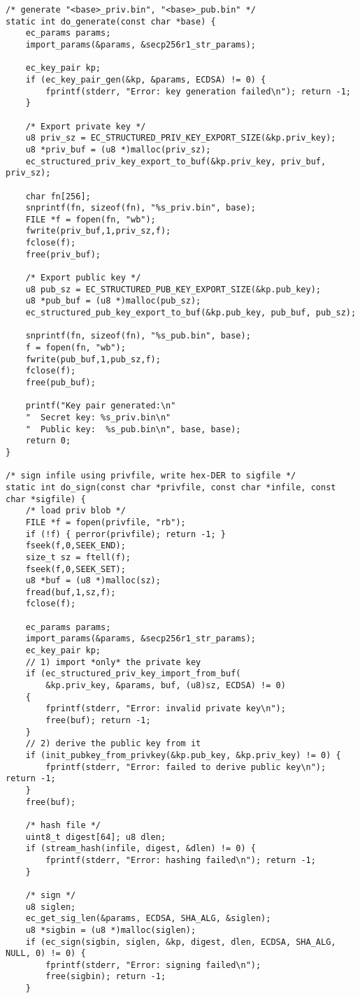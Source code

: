 \begin{lstlisting}[style=cstyle]
/* generate "<base>_priv.bin", "<base>_pub.bin" */
static int do_generate(const char *base) {
	ec_params params;
	import_params(&params, &secp256r1_str_params);
	
	ec_key_pair kp;
	if (ec_key_pair_gen(&kp, &params, ECDSA) != 0) {
		fprintf(stderr, "Error: key generation failed\n"); return -1;
	}
	
	/* Export private key */
	u8 priv_sz = EC_STRUCTURED_PRIV_KEY_EXPORT_SIZE(&kp.priv_key);
	u8 *priv_buf = (u8 *)malloc(priv_sz);
	ec_structured_priv_key_export_to_buf(&kp.priv_key, priv_buf, priv_sz);
	
	char fn[256];
	snprintf(fn, sizeof(fn), "%s_priv.bin", base);
	FILE *f = fopen(fn, "wb");
	fwrite(priv_buf,1,priv_sz,f);
	fclose(f);
	free(priv_buf);
	
	/* Export public key */
	u8 pub_sz = EC_STRUCTURED_PUB_KEY_EXPORT_SIZE(&kp.pub_key);
	u8 *pub_buf = (u8 *)malloc(pub_sz);
	ec_structured_pub_key_export_to_buf(&kp.pub_key, pub_buf, pub_sz);
	
	snprintf(fn, sizeof(fn), "%s_pub.bin", base);
	f = fopen(fn, "wb");
	fwrite(pub_buf,1,pub_sz,f);
	fclose(f);
	free(pub_buf);
	
	printf("Key pair generated:\n"
	"  Secret key: %s_priv.bin\n"
	"  Public key:  %s_pub.bin\n", base, base);
	return 0;
}

/* sign infile using privfile, write hex-DER to sigfile */
static int do_sign(const char *privfile, const char *infile, const char *sigfile) {
	/* load priv blob */
	FILE *f = fopen(privfile, "rb");
	if (!f) { perror(privfile); return -1; }
	fseek(f,0,SEEK_END);
	size_t sz = ftell(f);
	fseek(f,0,SEEK_SET);
	u8 *buf = (u8 *)malloc(sz);
	fread(buf,1,sz,f);
	fclose(f);
	
	ec_params params;
	import_params(&params, &secp256r1_str_params);
	ec_key_pair kp;
	// 1) import *only* the private key
	if (ec_structured_priv_key_import_from_buf(
		&kp.priv_key, &params, buf, (u8)sz, ECDSA) != 0)
	{
		fprintf(stderr, "Error: invalid private key\n");
		free(buf); return -1;
	}
	// 2) derive the public key from it
	if (init_pubkey_from_privkey(&kp.pub_key, &kp.priv_key) != 0) {
		fprintf(stderr, "Error: failed to derive public key\n"); return -1;
	}
	free(buf);
	
	/* hash file */
	uint8_t digest[64]; u8 dlen;
	if (stream_hash(infile, digest, &dlen) != 0) {
		fprintf(stderr, "Error: hashing failed\n"); return -1;
	}
	
	/* sign */
	u8 siglen;
	ec_get_sig_len(&params, ECDSA, SHA_ALG, &siglen);
	u8 *sigbin = (u8 *)malloc(siglen);
	if (ec_sign(sigbin, siglen, &kp, digest, dlen, ECDSA, SHA_ALG, NULL, 0) != 0) {
		fprintf(stderr, "Error: signing failed\n");
		free(sigbin); return -1;
	}
	

\end{lstlisting}
